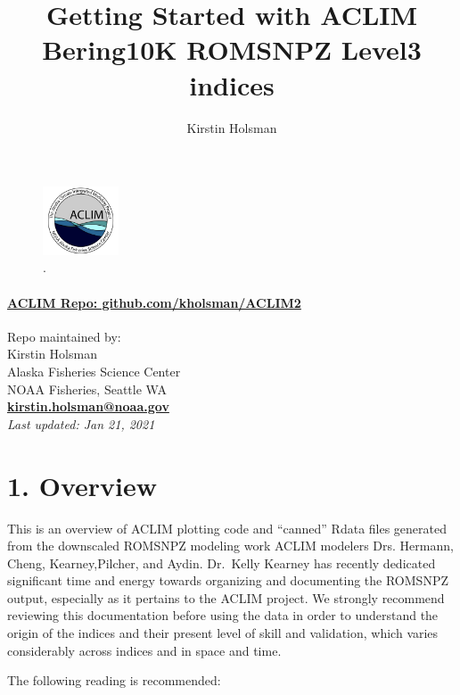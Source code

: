 \documentclass[
]{article}
\title{Getting Started with ACLIM Bering10K ROMSNPZ Level3 indices}
\author{Kirstin Holsman}
\date{}
\begin{document}
\maketitle

{
\setcounter{tocdepth}{2}
\tableofcontents
}
\begin{figure}
\centering
\includegraphics[width=0.2\textwidth,height=\textheight]{Figs/ACLIM_logo.jpg}
\caption{.}
\end{figure}

\hypertarget{aclim-repo-github.comkholsmanaclim2}{%
\paragraph{\texorpdfstring{\href{https://github.com/kholsman/ACLIM2}{\textbf{ACLIM
Repo:
github.com/kholsman/ACLIM2}}}{ACLIM Repo: github.com/kholsman/ACLIM2}}\label{aclim-repo-github.comkholsmanaclim2}}

Repo maintained by:\\
Kirstin Holsman\\
Alaska Fisheries Science Center\\
NOAA Fisheries, Seattle WA\\
\textbf{\url{kirstin.holsman@noaa.gov}}~\\
\emph{Last updated: Jan 21, 2021}

\hypertarget{overview}{%
\section{1. Overview}\label{overview}}

This is an overview of ACLIM plotting code and ``canned'' Rdata files
generated from the downscaled ROMSNPZ modeling work ACLIM modelers Drs.
Hermann, Cheng, Kearney,Pilcher, and Aydin. Dr.~Kelly Kearney has
recently dedicated significant time and energy towards organizing and
documenting the ROMSNPZ output, especially as it pertains to the ACLIM
project. We strongly recommend reviewing this documentation before using
the data in order to understand the origin of the indices and their
present level of skill and validation, which varies considerably across
indices and in space and time.

The following reading is recommended:
\end{document}
